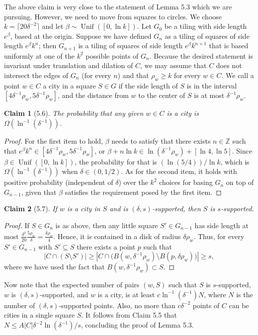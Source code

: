 \documentclass[UTF8,11pt]{ctexart}
\newtheorem*{claim}{Claim}
\theoremstyle{definition}
\newcommand{\Z}{\mathbb Z}
\begin{document}
The above claim is very close to the statement of Lemma 5.3 which we are pursuing. However, we need to move from squares to circles. We choose $k=\lceil20\delta^{-2}\rceil$ and let $\beta\sim\operatorname{Unif}([0,\ln k])$. Let $G_0$ be a tiling with side length $e^\beta$, based at the origin.
Suppose we have defined $G_n$ as a tiling of squares of side length $e^\beta k^n$; then $G_{n+1}$ is a tiling of squares of side length $e^\beta k^{n+1}$ that is based uniformly at one of the $k^2$ possible points of $G_n$. Because the desired statement is invariant under translation and dilation of $C$, we may assume that $C$ does not intersect the edges of $G_n$ (for every $n$) and that $\rho_w\ge k$ for every $w\in C$. We call a point $w\in C$ a city in a square $S\in G$ if the side length of $S$ is in the interval $[4\delta^{-1}\rho_w,5\delta^{-1}\rho_w]$, and the distance from $w$ to the center of $S$ is at most $\delta^{-1}\rho_w$.
\begin{claim}[5.6]
The probability that any given $w\in C$ is a city is $\Omega(\ln^{-1}(\delta^{-1}))$.
\end{claim}
\begin{proof}
For the first item to hold, $\beta$ needs to satisfy that there exists $n\in\Z$ such that $e^\beta k^n\in[4\delta^{-1}\rho_w,5\delta^{-1}\rho_w]$, or $\beta+n\ln k\in\ln(\delta^{-1}\rho_w)+[\ln4,\ln5]$. Since $\beta\in\operatorname{Unif}([0,\ln k])$, the probability for that is $(\ln(5/4))/\ln k$, which is $\Omega(\ln^{-1}(\delta^{-1}))$ when $\delta\in(0,1/2)$.
As for the second item, it holds with positive probability (independent of $\delta$) over the $k^2$ choices for basing $G_n$ on top of $G_{n-1}$, given that $\beta$ satisfies the requirement posed by the first item.
\end{proof}
\begin{claim}[5.7]
If $w$ is a city in $S$ and is $(\delta,s)$-supported, then $S$ is $s$-supported.
\end{claim}
\begin{proof}
If $S\in G_n$ is as above, then any little square $S'\in G_{n-1}$ has side length at most
$\frac{\delta^2}{20}\frac{5\rho_w}{\delta}=\frac{\delta\rho_w}{4}$.
Hence, it is contained in a disk of radius $\delta\rho_w$. Thus, for every $S'\in G_{n-1}$ with $S'\subseteq S$ there exists a point $p$ such that
\[
|C\cap(S\setminus S')|\ge\left|C\cap\bigl(B(w,\delta^{-1}\rho_w)\setminus B(p,\delta\rho_w)\bigr)\right|\ge s,
\]
where we have used the fact that $B(w,\delta^{-1}\rho_w)\subset S$.
\end{proof}
Now note that the expected number of pairs $(w,S)$ such that $S$ is $s$-supported, $w$ is $(\delta,s)$-supported, and $w$ is a city, is at least $c\ln^{-1}(\delta^{-1})N$, where $N$ is the number of $(\delta,s)$-supported points. Also, no more than $c\delta^{-2}$ points of $C$ can be cities in a single square $S$. It follows from Claim 5.5 that $N\le A|C|\delta^{-2}\ln(\delta^{-1})/s$, concluding the proof of Lemma 5.3.
\end{document}
